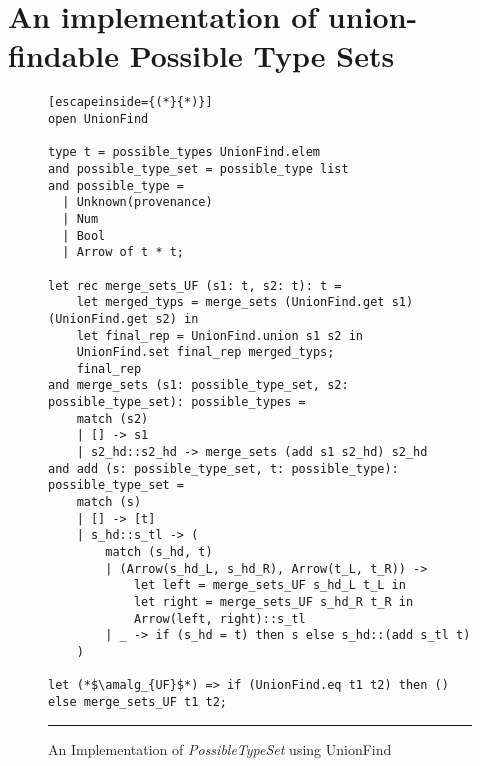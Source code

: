 \newpage
\section{An implementation of union-findable Possible Type Sets}

\begin{figure}[h!]
\begin{lstlisting}[escapeinside={(*}{*)}]
open UnionFind

type t = possible_types UnionFind.elem
and possible_type_set = possible_type list
and possible_type =
  | Unknown(provenance)
  | Num
  | Bool
  | Arrow of t * t;

let rec merge_sets_UF (s1: t, s2: t): t =
    let merged_typs = merge_sets (UnionFind.get s1) (UnionFind.get s2) in
    let final_rep = UnionFind.union s1 s2 in
    UnionFind.set final_rep merged_typs;
    final_rep
and merge_sets (s1: possible_type_set, s2: possible_type_set): possible_types = 
    match (s2)
    | [] -> s1
    | s2_hd::s2_hd -> merge_sets (add s1 s2_hd) s2_hd
and add (s: possible_type_set, t: possible_type): possible_type_set =
    match (s)
    | [] -> [t]
    | s_hd::s_tl -> (
        match (s_hd, t)
        | (Arrow(s_hd_L, s_hd_R), Arrow(t_L, t_R)) ->
            let left = merge_sets_UF s_hd_L t_L in
            let right = merge_sets_UF s_hd_R t_R in
            Arrow(left, right)::s_tl
        | _ -> if (s_hd = t) then s else s_hd::(add s_tl t)
    )

let (*$\amalg_{UF}$*) => if (UnionFind.eq t1 t2) then () else merge_sets_UF t1 t2;

\end{lstlisting}
 \hrule
\caption{An Implementation of \textit{PossibleTypeSet} using UnionFind}
\label{fig:ufalgcode}
\end{figure}